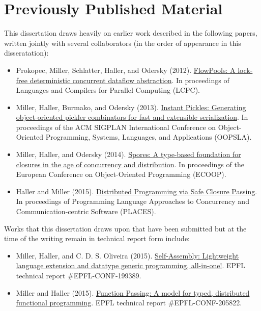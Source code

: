 \section{Previously Published Material}

This dissertation draws heavily on earlier work described in the following
papers, written jointly with several collaborators (in the order of appearance
in this disseratation):

\begin{itemize}

	\item Prokopec, Miller, Schlatter, Haller, and Odersky (2012).
	\href{http://infoscience.epfl.ch/record/180265}{FlowPools: A lock-free
	deterministic concurrent dataflow abstraction}. In proceedings of Languages and
	Compilers for Parallel Computing (LCPC).

	\item Miller, Haller, Burmako, and Odersky (2013).
	\href{http://infoscience.epfl.ch/record/188383}{Instant Pickles: Generating
	object-oriented pickler combinators for fast and extensible serialization}. In proceedings of the ACM SIGPLAN International Conference on Object-Oriented Programming, Systems, Languages, and Applications (OOPSLA).

	\item Miller, Haller, and Odersky (2014).
	\href{http://infoscience.epfl.ch/record/191239}{Spores: A type-based
	foundation for closures in the age of concurrency and distribution}. In
	proceedings of the European Conference on Object-Oriented Programming (ECOOP).

	\item Haller and Miller (2015).
	\href{https://infoscience.epfl.ch/record/205039}{Distributed Programming
	via Safe Closure Passing}. In proceedings of Programming Language Approaches to
	Concurrency and Communication-centric Software (PLACES).

\end{itemize}

Works that this dissertation draws upon that have been submitted but at the time
of the writing remain in technical report form include:

\begin{itemize}

	\item Miller, Haller, and C. D. S. Oliveira (2015). \href{http://infoscience.epfl.ch/record/199389}{Self-Assembly: Lightweight language extension and datatype generic programming, all-in-one!}. EPFL technical report \#EPFL-CONF-199389.

	\item Miller and Haller (2015).
	\href{http://infoscience.epfl.ch/record/205822}{Function Passing: A model for
	typed, distributed functional programming}. EPFL technical report
	\#EPFL-CONF-205822.

\end{itemize}
